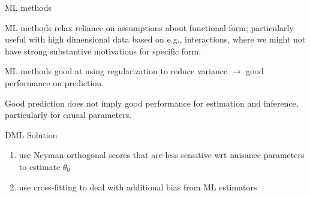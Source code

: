 \documentclass[xcolor={table}]{beamer}
\begin{document}
\note{
\scriptsize \singlespacing

}
\begin{frame}{ML methods}

\begin{wideitemize}
\item ML methods relax reliance on assumptions about functional form; \pause particularly useful with high dimensional data based on e.g., interactions, where we might not have strong substantive motivations for specific form. \pause
\item ML methods good at using regularization to reduce variance \pause $\rightarrow$ good performance on prediction. \pause
\item Good prediction does not imply good performance for estimation and inference, particularly for causal parameters.
\end{wideitemize}

\end{frame}


\note{
\scriptsize \singlespacing

}
\begin{frame}{DML Solution}

\begin{enumerate}
\item use Neyman-orthogonal scores that are less sensitive wrt nuisance parameters to estimate $\theta_0$\pause
\item use cross-fitting to deal with additional bias from ML estimators
\end{enumerate}

\end{frame}
\end{document}
